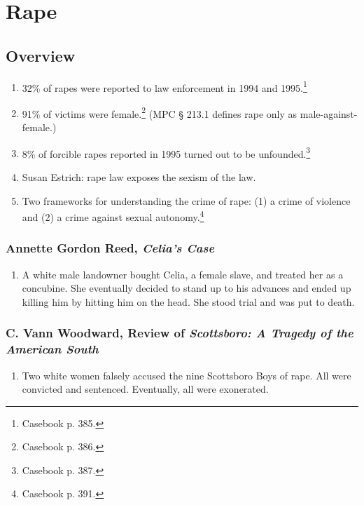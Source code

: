 \section{Rape}

\subsection{Overview}

\begin{enumerate}
    \item 32\% of rapes were reported to law enforcement in 1994 and 1995.\footnote{Casebook p. 385.}
    \item 91\% of victims were female.\footnote{Casebook p. 386.} (MPC § 213.1 defines rape only as male-against-female.)
    \item 8\% of forcible rapes reported in 1995 turned out to be unfounded.\footnote{Casebook p. 387.}
    \item Susan Estrich: rape law exposes the sexism of the law.
    \item Two frameworks for understanding the crime of rape: (1) a crime of violence and (2) a crime against sexual autonomy.\footnote{Casebook p. 391.}
\end{enumerate}

\subsubsection{Annette Gordon Reed, \emph{Celia's Case}}

\begin{enumerate}
    \item A white male landowner bought Celia, a female slave, and treated her as a concubine. She eventually decided to stand up to his advances and ended up killing him by hitting him on the head. She stood trial and was put to death.
\end{enumerate}

\subsubsection{C. Vann Woodward, Review of \emph{Scottsboro: A Tragedy of the American South}}

\begin{enumerate}
    \item Two white women falsely accused the nine Scottsboro Boys of rape. All were convicted and sentenced. Eventually, all were exonerated.
\end{enumerate}

